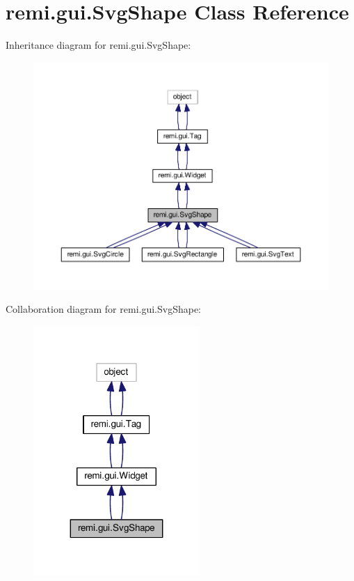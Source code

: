 \hypertarget{classremi_1_1gui_1_1SvgShape}{}\section{remi.\+gui.\+Svg\+Shape Class Reference}
\label{classremi_1_1gui_1_1SvgShape}


Inheritance diagram for remi.\+gui.\+Svg\+Shape\+:
\nopagebreak
\begin{figure}[H]
\begin{center}
\leavevmode
\includegraphics[width=350pt]{d9/dd3/classremi_1_1gui_1_1SvgShape__inherit__graph}
\end{center}
\end{figure}


Collaboration diagram for remi.\+gui.\+Svg\+Shape\+:
\nopagebreak
\begin{figure}[H]
\begin{center}
\leavevmode
\includegraphics[width=179pt]{d1/d0a/classremi_1_1gui_1_1SvgShape__coll__graph}
\end{center}
\end{figure}
